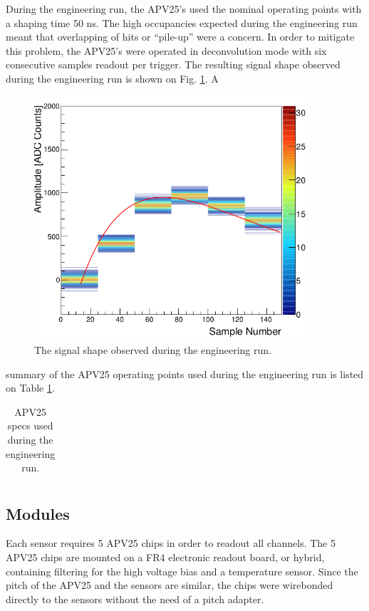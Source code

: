 During the engineering run, the APV25's used the nominal  operating points with
a shaping time 50 ns.  The high occupancies expected during the engineering run
meant that overlapping of hits or ``pile-up'' were a concern.  In order to 
mitigate this problem, the APV25's were operated in deconvolution mode with
six consecutive samples readout per trigger.  The resulting signal shape 
observed during the engineering run is shown on Fig. \ref{fig:apv_shape}.  A 
\begin{figure}
    \centering
    \includegraphics[width=0.9\textwidth]{images/sideB_response_ch535.png}
    \caption{The signal shape observed during the engineering run.}
    \label{fig:apv_shape}
\end{figure}
summary of the APV25 operating points used during the engineering run is listed
on Table \ref{tab:apv_specs}.
\begin{table}[t]
    \centering
    \begin{tabular}{l|c}
        \hline
        \hline
    \end{tabular}
    \caption{APV25 specs used during the engineering run.}
    \label{tab:apv_specs}
\end{table}

\subsection{Modules}

Each sensor requires 5 APV25 chips in order to readout all channels.  The 5 
APV25 chips are mounted on a FR4 electronic readout board, or hybrid, containing
filtering for the high voltage bias and a temperature sensor.  Since the pitch
of the APV25 and the sensors are similar, the chips were wirebonded directly to
the sensors without the need of a pitch adapter.

